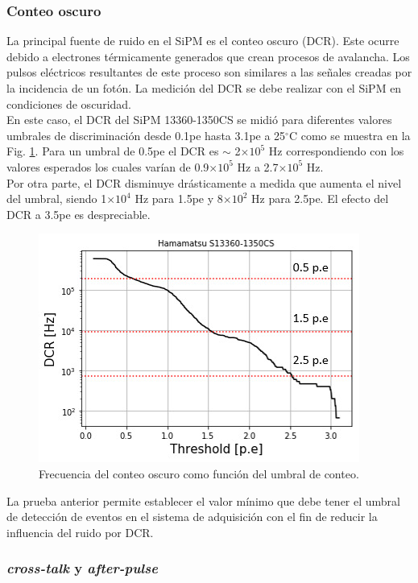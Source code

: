\subsubsection{Conteo oscuro}

La principal fuente de ruido en el SiPM es el conteo oscuro (DCR). Este ocurre debido a electrones térmicamente generados que crean procesos de avalancha. Los pulsos eléctricos resultantes de este proceso son similares a las señales creadas por la incidencia de un fotón. La medición del DCR se debe realizar con el SiPM en condiciones de oscuridad.\\

En este caso, el DCR del SiPM 13360-1350CS se midió para diferentes valores umbrales de discriminación desde 0.1pe hasta 3.1pe a 25$^{\circ}$C como se muestra en la Fig. \ref{DCR}. Para un umbral de 0.5pe el DCR es $\sim$ 2$\times 10^5$ Hz correspondiendo con los valores esperados los cuales varían de 0.9$\times 10^5$ Hz a 2.7$\times 10^5$ Hz.\\

Por otra parte, el DCR disminuye drásticamente a medida que aumenta el nivel del umbral, siendo 1$\times 10^4$ Hz para 1.5pe y  8$\times 10^2$ Hz para 2.5pe. El efecto del DCR a 3.5pe es despreciable.

\begin{figure}[h!]
\centering
\includegraphics[scale=0.7]{Figures/DCR.jpeg} 
\caption{Frecuencia del conteo oscuro como función del umbral de conteo. }
\label{DCR}
\end{figure}
La prueba anterior permite establecer el valor mínimo que debe tener el umbral de detección de eventos en el sistema de adquisición con el fin de reducir la influencia del ruido por DCR.

\subsubsection{\textit{cross-talk} y \textit{after-pulse}}

